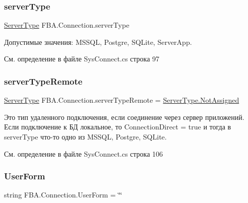 \subsubsection{\texorpdfstring{server\+Type}{serverType}}
{\footnotesize\ttfamily \mbox{\hyperlink{namespace_f_b_a_a54b34d51226fe01d01f79d9fcb237413}{Server\+Type}} F\+B\+A.\+Connection.\+server\+Type}



Допустимые значения\+: M\+S\+S\+QL, Postgre, S\+Q\+Lite, Server\+App. 



См. определение в файле Sys\+Connect.\+cs строка 97

\mbox{\label{class_f_b_a_1_1_connection_ada46cb57e3fc2bea5b69c026d2eba248}} 
\subsubsection{\texorpdfstring{server\+Type\+Remote}{serverTypeRemote}}
{\footnotesize\ttfamily \mbox{\hyperlink{namespace_f_b_a_a54b34d51226fe01d01f79d9fcb237413}{Server\+Type}} F\+B\+A.\+Connection.\+server\+Type\+Remote = \mbox{\hyperlink{namespace_f_b_a_a54b34d51226fe01d01f79d9fcb237413a316d54b418d9a7186f9234f08cfb599f}{Server\+Type.\+Not\+Assigned}}}



Это тип удаленного подключения, если соединение через сервер приложений. Если подключение к БД локальное, то Connection\+Direct = true и тогда в server\+Type что-\/то одно из M\+S\+S\+QL, Postgre, S\+Q\+Lite. 



См. определение в файле Sys\+Connect.\+cs строка 106

\mbox{\label{class_f_b_a_1_1_connection_a6ce212094097c98af886a3417b1510cc}} 
\subsubsection{\texorpdfstring{User\+Form}{UserForm}}
{\footnotesize\ttfamily string F\+B\+A.\+Connection.\+User\+Form = \char`\"{}\char`\"{}}




